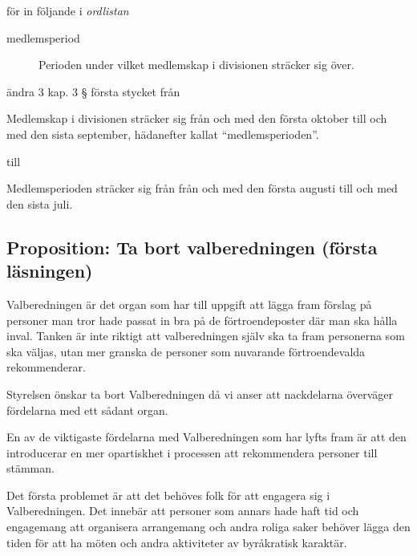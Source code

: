 \documentclass[protokoll]{dvd}
\begin{document}
\begin{attsatser}
	\item för in följande i \emph{ordlistan}

	\begin{displayquote}
		\begin{description}
			\item[medlemsperiod] Perioden under vilket medlemskap i divisionen sträcker sig över.
		\end{description}
	\end{displayquote}

	\item ändra 3 kap. 3 § första stycket från

	\begin{displayquote}
		Medlemskap i divisionen sträcker sig från och med den första oktober till och med den sista september, hädanefter kallat ``medlemsperioden''.
	\end{displayquote}

	till

	\begin{displayquote}
		Medlemsperioden sträcker sig från från och med den första augusti till och med den sista juli.
	\end{displayquote}
\end{attsatser}

\newpage
\subsection{Proposition: Ta bort valberedningen (första läsningen)}

Valberedningen är det organ som har till uppgift att lägga fram förslag på personer man tror hade passat in bra på de förtroendeposter där man ska hålla inval.
Tanken är inte riktigt att valberedningen själv ska ta fram personerna som ska väljas, utan mer granska de personer som nuvarande förtroendevalda rekommenderar.

Styrelsen önskar ta bort Valberedningen då vi anser att nackdelarna överväger fördelarna med ett sådant organ.

En av de viktigaste fördelarna med Valberedningen som har lyfts fram är att den introducerar en mer opartiskhet i processen att rekommendera personer till stämman.

Det första problemet är att det behöves folk för att engagera sig i Valberedningen.
Det innebär att personer som annars hade haft tid och engagemang att organisera arrangemang och andra roliga saker behöver lägga den tiden för att ha möten och andra aktiviteter av byråkratisk karaktär.
\end{document}
